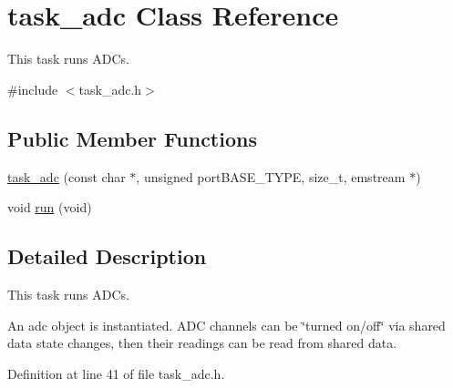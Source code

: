 \hypertarget{classtask__adc}{\section{task\-\_\-adc \-Class \-Reference}
\label{classtask__adc}
}


\-This task runs \-A\-D\-Cs.  




{\ttfamily \#include $<$task\-\_\-adc.\-h$>$}

\subsection*{\-Public \-Member \-Functions}
\begin{DoxyCompactItemize}
\item 
\hyperlink{classtask__adc_a277193acbf12b557e38543031a8ef14d}{task\-\_\-adc} (const char $\ast$, unsigned port\-B\-A\-S\-E\-\_\-\-T\-Y\-P\-E, size\-\_\-t, emstream $\ast$)
\item 
void \hyperlink{classtask__adc_a3ef916a139b496f8edfd56fb89bbf555}{run} (void)
\end{DoxyCompactItemize}


\subsection{\-Detailed \-Description}
\-This task runs \-A\-D\-Cs. 

\-An adc object is instantiated. \-A\-D\-C channels can be \char`\"{}turned on/off\char`\"{} via shared data state changes, then their readings can be read from shared data. 

\-Definition at line 41 of file task\-\_\-adc.\-h.



